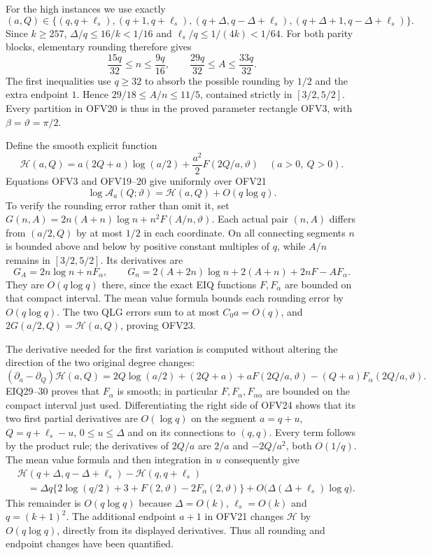 \documentclass[11pt,a4paper]{article}
\begin{document}
For the high instances we use exactly
\[
(a,Q)\in
\{(q,q+\ell_s),(q+1,q+\ell_s),
  (q+\Delta,q-\Delta+\ell_s),
  (q+\Delta+1,q-\Delta+\ell_s)\}.
\tag{OFV21}
\]
Since $k\ge257$, $\Delta/q\le16/k<1/16$ and
$\ell_s/q\le1/(4k)<1/64$.
For both parity blocks, elementary rounding therefore gives
\[
\frac{15q}{32}\le n\le\frac{9q}{16},\qquad
\frac{29q}{32}\le A\le\frac{33q}{32}.
\]
The first inequalities use $q\ge32$ to absorb the possible
rounding by $1/2$ and the extra endpoint $1$.
Hence $29/18\le A/n\le11/5$, contained strictly in $[3/2,5/2]$.
Every partition in OFV20 is thus in the proved parameter rectangle
OFV3, with $\beta=\vartheta=\pi/2$.

Define the smooth explicit function
\[
\mathcal H(a,Q)=
a(2Q+a)\log(a/2)+\frac{a^2}{2}F(2Q/a,\vartheta)
\quad(a>0,\ Q>0).
\tag{OFV22}
\]
Equations OFV3 and OFV19--20 give uniformly over OFV21
\[
\log\mathcal A_a(Q;\vartheta)=\mathcal H(a,Q)+O(q\log q).
\tag{OFV23}
\]
To verify the rounding error rather than omit it, set
$G(n,A)=2n(A+n)\log n+n^2F(A/n,\vartheta)$.
Each actual pair $(n,A)$ differs from $(a/2,Q)$ by at most $1/2$
in each coordinate. On all connecting segments $n$ is bounded
above and below by positive constant multiples of $q$, while
$A/n$ remains in $[3/2,5/2]$.
Its derivatives are
\[
G_A=2n\log n+nF_\alpha,\qquad
G_n=2(A+2n)\log n+2(A+n)+2nF-AF_\alpha .
\]
They are $O(q\log q)$ there, since the exact EIQ functions
$F,F_\alpha$ are bounded on that compact interval. The mean value
formula bounds each rounding error by $O(q\log q)$.
The two QLG errors sum to at most $C_0a=O(q)$, and
$2G(a/2,Q)=\mathcal H(a,Q)$, proving OFV23.

The derivative needed for the first variation is computed without
altering the direction of the two original degree changes:
\[
(\partial_a-\partial_Q)\mathcal H(a,Q)
=2Q\log(a/2)+(2Q+a)+aF(2Q/a,\vartheta)
 -(Q+a)F_\alpha(2Q/a,\vartheta).
\tag{OFV24}
\]
EIQ29--30 proves that $F_\alpha$ is smooth; in particular
$F,F_\alpha,F_{\alpha\alpha}$ are bounded on the compact interval
just used. Differentiating the right side of OFV24 shows that
its two first partial derivatives are $O(\log q)$ on the segment
$a=q+u$, $Q=q+\ell_s-u$, $0\le u\le\Delta$ and on its
connections to $(q,q)$. Every term follows by the product rule;
the derivatives of $2Q/a$ are $2/a$ and $-2Q/a^2$, both $O(1/q)$.
The mean value formula and then integration in $u$ consequently give
\[
\begin{split}
&\mathcal H(q+\Delta,q-\Delta+\ell_s)
             -\mathcal H(q,q+\ell_s)\\
&\quad=
\Delta q\{2\log(q/2)+3+F(2,\vartheta)-2F_\alpha(2,\vartheta)\}
+O\bigl(\Delta(\Delta+\ell_s)\log q\bigr).
\end{split}\tag{OFV25}
\]
This remainder is $O(q\log q)$ because
$\Delta=O(k)$, $\ell_s=O(k)$ and $q=(k+1)^2$.
The additional endpoint $a+1$ in OFV21 changes $\mathcal H$
by $O(q\log q)$, directly from its displayed derivatives.
Thus all rounding and endpoint changes have been quantified.
\end{document}
